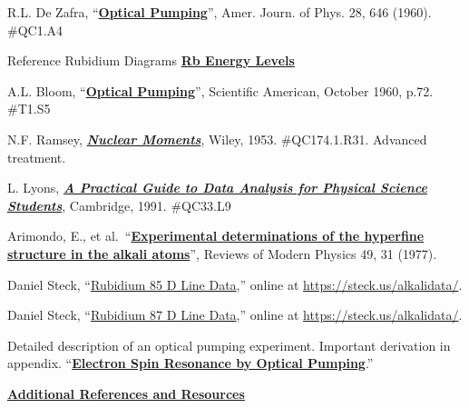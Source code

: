 \documentclass{../lab}
\newcommand{\OpticalPumpingZafra}{https://berkeley-physics111b.github.io/assets/pdf/oldwebsitestructure/OPT/References/05-Optical_Pumping-DeZafra.pdf}
\newcommand{\RbEnergyLevels}{https://berkeley-physics111b.github.io/assets/pdf/oldwebsitestructure/images/OPT_RbEnergyLevels.pdf}
\newcommand{\OpticalPumpingBloom}{https://berkeley-physics111b.github.io/assets/pdf/oldwebsitestructure/OPT/References/02-Optical_Pumping-Bloom.pdf}
\newcommand{\ExperimentSeven}{https://berkeley-physics111b.github.io/assets/pdf/oldwebsitestructure/OPT/References/06-Experiment_7.pdf}
\newcommand{\NuclearMoments}{https://berkeley-physics111b.github.io/assets/pdf/oldwebsitestructure/OPT/References/04-Nuclear_Moments.pdf}
\newcommand{\Rubidium}{https://berkeley-physics111b.github.io/assets/pdf/oldwebsitestructure/OPT/References/OPT\%20Rubidium.pdf}
\newcommand{\OPTReprints}{http://physics111.lib.berkeley.edu/Physics111/Reprints/OPT/OPT_index.html}
\newcommand{\ErrorAnalysis}{https://berkeley-physics111b.github.io/assets/pdf/oldwebsitestructure/EAX/Taylor_An\%20Introduction\%20to\%20Error\%20Analysis.pdf}
\newcommand{\DataAnalysis}{https://berkeley-physics111b.github.io/assets/pdf/oldwebsitestructure/EAX/Lyons_A\%20Practical\%20Guide\%20to\%20Error\%20Analysis.pdf}
\newcommand{\RevModPhys}{https://berkeley-physics111b.github.io/assets/pdf/oldwebsitestructure/OPT/References/RevModPhys.49.31.pdf}
\newcommand{\Steckfive}{https://berkeley-physics111b.github.io/assets/pdf/oldwebsitestructure/OPT/References/rubidium85numbers.pdf}
\newcommand{\Steckseven}{https://berkeley-physics111b.github.io/assets/pdf/oldwebsitestructure/OPT/References/rubidium87numbers.pdf}
\newcommand{\AdditionalReferences}
{https://berkeley-physics111b.github.io/assets/pdf/oldwebsitestructure/OPT/References/00-OPT_Additional\%20References\%20and\%20Resources_Index.pdf}
\begin{document}
\begin{thebibliography}{}
\label{references}

R.L. De Zafra, ``\href{\OpticalPumpingZafra}{\textbf{Optical Pumping}}'', Amer. Journ. of Phys. 28, 646 (1960). \#QC1.A4

Reference Rubidium Diagrams \href{\RbEnergyLevels}{\textbf{Rb Energy Levels}}

A.L. Bloom, ``\href{\OpticalPumpingBloom}{\textbf{Optical Pumping}}'', Scientific American, October 1960, p.72. \#T1.S5

N.F. Ramsey, \href{\NuclearMoments}{\textbf{\textit{Nuclear Moments}}}, Wiley, 1953. \#QC174.1.R31. Advanced treatment.







L. Lyons, \href{\DataAnalysis}{\textbf{\textit{A Practical Guide to Data Analysis for Physical Science Students}}}, Cambridge, 1991. \#QC33.L9


Arimondo, E., et al.\ ``\href{\RevModPhys}{\textbf{Experimental determinations of the hyperfine structure in the alkali atoms}}'', Reviews of Modern Physics 49, 31 (1977).

Daniel Steck, ``\href{\Steckfive}{Rubidium 85 D Line Data},'' online at \url{https://steck.us/alkalidata/}. 

Daniel Steck, ``\href{\Steckseven}{Rubidium 87 D Line Data},'' online at \url{https://steck.us/alkalidata/}.

Detailed description of an optical pumping experiment. Important derivation in appendix. ``\href{\ExperimentSeven}{\textbf{Electron Spin Resonance by Optical Pumping}}.''

\href{\AdditionalReferences}{\textbf{Additional References and Resources}}


\end{thebibliography}
\end{document}
